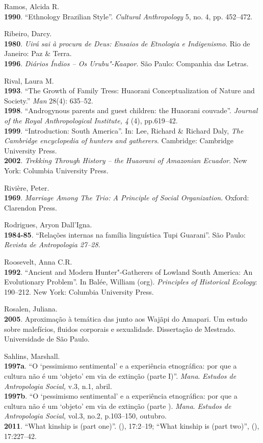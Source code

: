 \begin{Parskip}
Ramos, Alcida R.\\
\textbf{1990}. ``Ethnology Brazilian Style''. \emph{Cultural Anthropology}
5, no. 4, pp. 452--472.

Ribeiro, Darcy.\\
\textbf{1980}. \emph{Uirá sai à procura de Deus: Ensaios de Etnologia e
Indigenismo}. Rio de Janeiro: Paz \& Terra.\\
\textbf{1996}. \emph{Diários Índios -- Os Urubu"-Kaapor}. São Paulo:
Companhia das Letras.

Rival, Laura M.\\
\textbf{1993}. ``The Growth of Family Tress: Huaorani Conceptualization
of Nature and Society.'' \emph{Man} 28(4): 635--52.\\
\textbf{1998}. ``Androgynous parents and guest children: the Huaorani
couvade''. \emph{Journal of the Royal Anthropological Institute, 4} (4),
pp.619--42.\\
\textbf{1999}. ``Introduction: South America''. In: Lee, Richard \& Richard
Daly, \emph{The Cambridge encyclopedia of hunters and gatherers}.
Cambridge: Cambridge University Press.\\
\textbf{2002}. \emph{Trekking Through History -- the Huaorani of
Amazonian Ecuador}. New York: Columbia University Press.

Rivière, Peter.\\
\textbf{1969}. \emph{Marriage Among The Trio: A Principle of Social
Organization}. Oxford: Clarendon Press.

Rodrigues, Aryon Dall'Igna.\\
\textbf{1984-85}. ``Relações internas na família linguística Tupi
Guarani''. São Paulo: \emph{Revista de Antropologia 27--28}.

Roosevelt, Anna C.R.\\
\textbf{1992}. ``Ancient and Modern Hunter"-Gatherers of Lowland South
America: An Evolutionary Problem''. In Balée, William (org).
\emph{Principles of Historical Ecology}: 190--212. New York: Columbia
University Press.

Rosalen, Juliana.\\
\textbf{2005}. Aproximação à temática das  junto aos Wajãpi do
Amapari. Um estudo sobre malefícios, fluidos corporais e sexualidade.
Dissertação de Mestrado. Universidade de São Paulo.

Sahlins, Marshall.\\
\textbf{1997a}. ``O `pessimismo sentimental' e a experiência
etnográfica: por que a cultura não é um `objeto' em via de extinção
(parte I)''. \emph{Mana}. \emph{Estudos de Antropologia Social,} v.3,
n.1, abril.\\
\textbf{1997b}. ``O `pessimismo sentimental' e a experiência
etnográfica: por que a cultura não é um `objeto' em via de extinção
(parte ). \emph{Mana}. \emph{Estudos de Antropologia Social,} vol.3,
no.2, p.103--150, outubro.\\
\textbf{2011}. ``What kinship is (part one)''.  (), 17:2--19;
``What kinship is (part two)'',  (), 17:227--42.


\end{Parskip}
